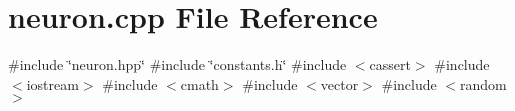 \section{neuron.\+cpp File Reference}
\label{neuron_8cpp}
{\ttfamily \#include \char`\"{}neuron.\+hpp\char`\"{}}\newline
{\ttfamily \#include \char`\"{}constants.\+h\char`\"{}}\newline
{\ttfamily \#include $<$cassert$>$}\newline
{\ttfamily \#include $<$iostream$>$}\newline
{\ttfamily \#include $<$cmath$>$}\newline
{\ttfamily \#include $<$vector$>$}\newline
{\ttfamily \#include $<$random$>$}\newline
